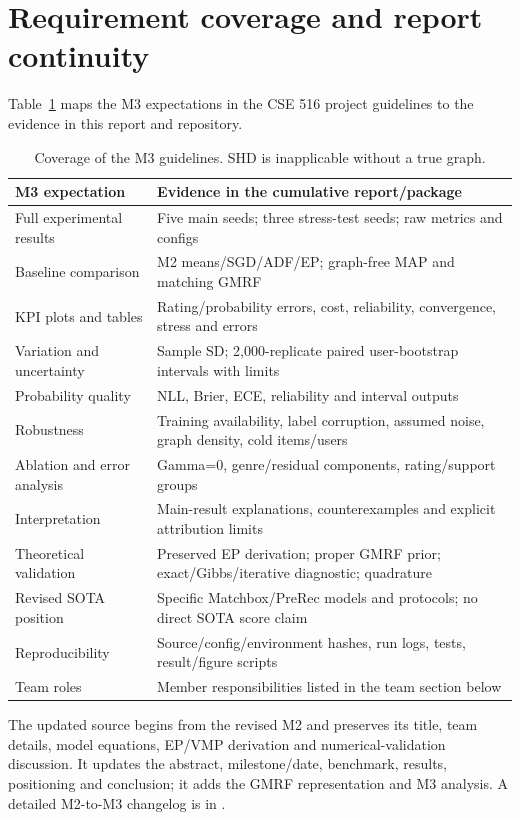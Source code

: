 \section{Requirement coverage and report continuity}
Table~\ref{tab:coverage} maps the M3 expectations in the CSE 516 project
guidelines to the evidence in this report and repository.

\begin{table}[!htbp]\centering\small
\begin{tabularx}{\linewidth}{@{}lX@{}}\toprule
M3 expectation & Evidence in the cumulative report/package\\\midrule
Full experimental results & Five main seeds; three stress-test seeds; raw metrics and configs\\
Baseline comparison & M2 means/SGD/ADF/EP; graph-free MAP and matching GMRF\\
KPI plots and tables & Rating/probability errors, cost, reliability, convergence, stress and errors\\
Variation and uncertainty & Sample SD; 2,000-replicate paired user-bootstrap intervals with limits\\
Probability quality & NLL, Brier, ECE, reliability and interval outputs\\
Robustness & Training availability, label corruption, assumed noise, graph density, cold items/users\\
Ablation and error analysis & Gamma=0, genre/residual components, rating/support groups\\
Interpretation & Main-result explanations, counterexamples and explicit attribution limits\\
Theoretical validation & Preserved EP derivation; proper GMRF prior; exact/Gibbs/iterative diagnostic; quadrature\\
Revised SOTA position & Specific Matchbox/PreRec models and protocols; no direct SOTA score claim\\
Reproducibility & Source/config/environment hashes, run logs, tests, result/figure scripts\\
Team roles & Member responsibilities listed in the team section below\\\bottomrule
\end{tabularx}
\caption{Coverage of the M3 guidelines. SHD is inapplicable without a true graph.}\label{tab:coverage}
\end{table}

The updated source begins from the revised M2  and preserves its
title, team details, model equations, EP/VMP derivation and numerical-validation
discussion. It updates the abstract, milestone/date, benchmark, results,
positioning and conclusion; it adds the GMRF representation and M3 analysis.
A detailed M2-to-M3 changelog is in .

